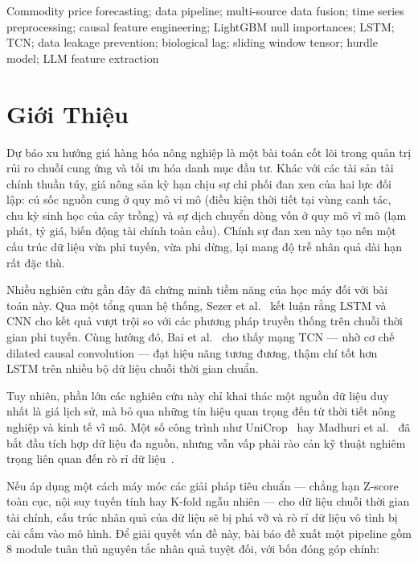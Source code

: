 \documentclass[conference]{IEEEtran}
\begin{document}
\begin{IEEEkeywords}
Commodity price forecasting; data pipeline; multi-source data fusion; time
series preprocessing; causal feature engineering; LightGBM null importances;
LSTM; TCN; data leakage prevention; biological lag; sliding window tensor;
hurdle model; LLM feature extraction
\end{IEEEkeywords}

\section{Giới Thiệu}

Dự báo xu hướng giá hàng hóa nông nghiệp là một bài toán cốt lõi trong quản
trị rủi ro chuỗi cung ứng và tối ưu hóa danh mục đầu tư. Khác với các tài
sản tài chính thuần túy, giá nông sản kỳ hạn chịu sự chi phối đan xen của hai
lực đối lập: cú sốc nguồn cung ở quy mô vi mô (điều kiện thời tiết tại vùng
canh tác, chu kỳ sinh học của cây trồng) và sự dịch chuyển dòng vốn ở quy mô
vĩ mô (lạm phát, tỷ giá, biến động tài chính toàn cầu). Chính sự đan xen này
tạo nên một cấu trúc dữ liệu vừa phi tuyến, vừa phi dừng, lại mang độ trễ
nhân quả dài hạn rất đặc thù.

Nhiều nghiên cứu gần đây đã chứng minh tiềm năng của học máy đối với bài
toán này. Qua một tổng quan hệ thống, Sezer et al.~\cite{sezer2020} kết luận
rằng LSTM và CNN cho kết quả vượt trội so với các phương pháp truyền thống
trên chuỗi thời gian phi tuyến. Cùng hướng đó, Bai et al.~\cite{bai2018} cho
thấy mạng TCN --- nhờ cơ chế dilated causal convolution --- đạt hiệu năng
tương đương, thậm chí tốt hơn LSTM trên nhiều bộ dữ liệu chuỗi thời gian
chuẩn.

Tuy nhiên, phần lớn các nghiên cứu này chỉ khai thác một nguồn dữ liệu duy
nhất là giá lịch sử, mà bỏ qua những tín hiệu quan trọng đến từ thời tiết
nông nghiệp và kinh tế vĩ mô. Một số công trình như UniCrop~\cite{khidirova2026}
hay Madhuri et al.~\cite{madhuri2025} đã bắt đầu tích hợp dữ liệu đa nguồn,
nhưng vẫn vấp phải rào cản kỹ thuật nghiêm trọng liên quan đến rò rỉ dữ
liệu~\cite{kaufman2012,roberts2022}.

Nếu áp dụng một cách máy móc các giải pháp tiêu chuẩn --- chẳng hạn Z-score
toàn cục, nội suy tuyến tính hay K-fold ngẫu nhiên --- cho dữ liệu chuỗi
thời gian tài chính, cấu trúc nhân quả của dữ liệu sẽ bị phá vỡ và rò rỉ dữ
liệu vô tình bị cài cắm vào mô hình. Để giải quyết vấn đề này, bài báo đề
xuất một pipeline gồm 8 module tuân thủ nguyên tắc nhân quả tuyệt đối, với
bốn đóng góp chính:
\end{document}
